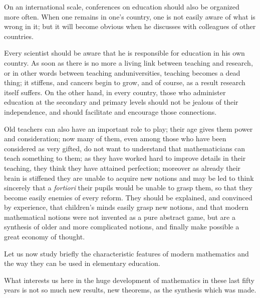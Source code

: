 On an international scale, conferences on education should also be organized more often. When one remains in one's country, one is not easily aware of what is wrong in it; but it will become obvious when he discusses with colleagues of other countries.

Every scientist should be aware that he is responsible for education in his own country. As soon as there is no more a living link between teaching and research, or in other words between teaching and\pageoriginale universities, teaching becomes a dead thing; it stiffens, and cancers begin to grow, and of course, as a result research itself suffers. On the other hand, in every country, those who administer education at the secondary and primary levels should not be jealous of their independence, and should facilitate and encourage those connections.

Old teachers can also have an important role to play; their age gives them power and consideration; now many of them, even among those who have been considered as very gifted, do not want to understand that mathematicians can teach something to them; as they have worked hard to improve details in their teaching, they think they have attained perfection; moreover as already their brain is stiffened they are unable to acquire new notions and may be led to think sincerely that a {\em fortiori} their pupils would be unable to grasp them, so that they become easily enemies of every reform. They should be explained, and convinced by experience, that children's minds easily grasp new notions, and that modern mathematical notions were not invented as a pure abstract game, but are a synthesis of older and more complicated notions, and finally make possible a great economy of thought.

Let us now study briefly the characteristic features of modern mathematics and the way they can be used in elementary education. 

What interests us here in the huge development of mathematics in these last fifty years is not so much new results, new theorems, as the synthesis which was made.

